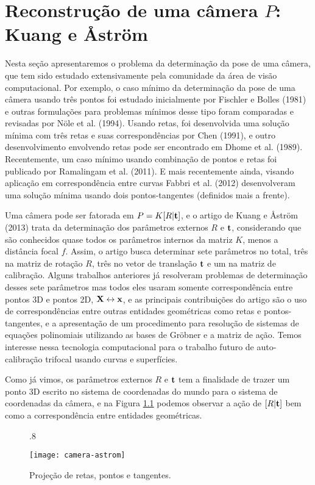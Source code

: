 \newpage
\chapter{Reconstrução de uma câmera $P$: Kuang e {\AA}str{\"o}m}\label{sec.astrom}

Nesta seção apresentaremos o problema da determinação da pose de uma câmera, que tem sido estudado extensivamente pela comunidade da área de visão computacional. Por exemplo, o caso mínimo da determinação da pose de uma câmera usando três pontos foi estudado inicialmente por Fischler e Bolles (1981) e outras formulações para problemas mínimos desse tipo foram comparadas e revisadas por N\"ole et al. (1994). Usando retas, foi desenvolvida uma solução mínima com três retas e suas correspondências por Chen (1991), e outro desenvolvimento envolvendo retas pode ser encontrado em Dhome et al. (1989). Recentemente, um caso mínimo usando combinação de pontos e retas foi publicado por Ramalingam et al. (2011). E mais recentemente ainda, visando aplicação em correspondência entre curvas Fabbri et al. (2012) desenvolveram uma solução mínima usando dois pontos-tangentes (definidos mais a frente).

Uma câmera pode ser fatorada em $P=K[R|{\bf t}]$, e o artigo de Kuang e \AA str\"om (2013) trata da determinação dos parâmetros externos $R$ e ${\bf t}$, considerando que são conhecidos quase todos os parâmetros internos da matriz $K$, menos a distância focal $f$. Assim, o artigo busca determinar sete parâmetros no total, três na matriz de rotação $R$, três no vetor de translação ${\bf t}$ e um na matriz de calibração. Alguns trabalhos anteriores já resolveram problemas de determinação desses sete parâmetros mas todos eles usaram somente correspondência entre pontos 3D e pontos 2D, $\mathbf{X}\leftrightarrow\mathbf{x}$, e as principais contribuições do artigo são o uso de correspondências entre outras entidades geométricas como retas e pontos-tangentes, e a apresentação de um procedimento para resolução de sistemas de equações polinomiais utilizando as bases de Gr\"obner e a matriz de ação. Temos interesse nessa tecnologia computacional para o trabalho futuro de auto-calibração trifocal usando curvas e superfícies. 

Como já vimos, os parâmetros externos $R$ e ${\bf t}$ tem a finalidade de trazer um ponto 3D escrito no sistema de coordenadas do mundo para o sistema de coordenadas da câmera, e na Figura \ref{fig.camera-astrom} podemos observar a ação de $[R|{\bf t}]$ bem como a correspondência entre entidades geométricas.
\begin{figure}[!htb]{.8\textwidth}
\caption{Projeç\~ao de retas, pontos e tangentes.}
\texttt{[image: camera-astrom]}
\label{fig.camera-astrom}
\end{figure}
